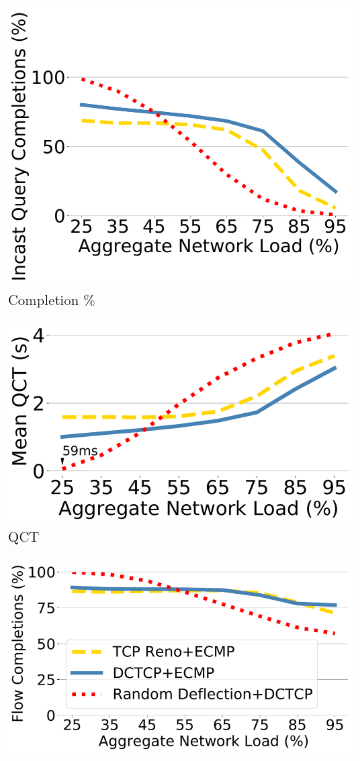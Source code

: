\begin{figure}[t]
	\centering
	
	\begin{subfigure}[t]{.32\linewidth}
	\centering
	\includegraphics[width=0.98\linewidth]{figs/cc1.pdf}
		\caption{\small{Completion \%}}
		\label{fig:motiv3}
	\end{subfigure}
	\begin{subfigure}[t]{.32\linewidth}
	\centering
	\includegraphics[width=0.98\linewidth]{figs/cc2.pdf}
		\caption{\small{QCT}}
		\label{fig:motiv4}
	\end{subfigure}
		\begin{subfigure}[t]{.32\linewidth}
	\centering
	\includegraphics[width=0.98\linewidth]{figs/cc4.pdf}

\end{subfigure}
\end{figure}
